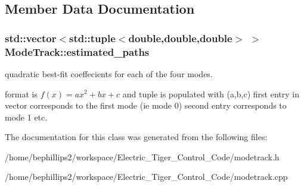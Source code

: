 \subsection{Member Data Documentation}
\hypertarget{class_mode_track_af99ee8eb4ea41c82bb67243e597744d1}{
\subsubsection[{estimated\-\_\-paths}]{\setlength{\rightskip}{0pt plus 5cm}std\-::vector$<$std\-::tuple$<$double,double,double$>$ $>$ Mode\-Track\-::estimated\-\_\-paths\hspace{0.3cm}{\ttfamily [protected]}}}\label{class_mode_track_af99ee8eb4ea41c82bb67243e597744d1}


quadratic best-\/fit coeffecients for each of the four modes. 

format is $ f(x) = a x^2+b x+c$ and tuple is populated with (a,b,c) first entry in vector corresponds to the first mode (ie mode 0) second entry corresponds to mode 1 etc. 

The documentation for this class was generated from the following files\-:\begin{DoxyCompactItemize}
\item 
/home/bephillips2/workspace/\-Electric\-\_\-\-Tiger\-\_\-\-Control\-\_\-\-Code/modetrack.\-h\item 
/home/bephillips2/workspace/\-Electric\-\_\-\-Tiger\-\_\-\-Control\-\_\-\-Code/modetrack.\-cpp\end{DoxyCompactItemize}
